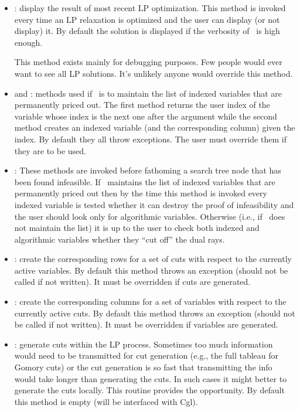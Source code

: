 \begin{itemize}
\item {}: display the result of most recent LP
  optimization. This method is invoked every time an LP relaxation is
  optimized and the user can display (or not display) it. By default the
  solution is displayed if the verbosity of \BB\ is high enough.

  This method exists mainly for debugging purposes. Few people would ever want
  to see all LP solutions. It's unlikely anyone would override this method.

\item {} and :
  methods used if \BB\ is to maintain the list of indexed variables that are
  permanently priced out. The first method returns the
  user index of the variable whose index is the next one after the argument
  while the second method creates an indexed variable (and the corresponding
  column) given the index.
  By default they all throw exceptions. The user must
  override them if they are to be used.

\item {}:
  These methods are invoked before fathoming a search tree node that has
  been found infeasible. If \BB\ maintains the list of indexed variables that
  are permanently priced out then by the time this method is invoked every
  indexed variable is tested whether it can destroy the proof of
  infeasibility and the user should look only for algorithmic variables.
  Otherwise (i.e., if \BB\ does not maintain the list) it is up to the user to
  check both indexed and algorithmic variables whether they ``cut off'' the
  dual rays. 

\item {}: create the corresponding rows for a set of cuts
  with 
  respect to the currently active variables. By default this method throws an
  exception (should not be called if not written). It must be overridden if
  cuts are generated.

\item {}: create the corresponding columns for a set of
  variables with respect to the currently active cuts. By default this
  method throws an exception (should not be called if not written). 
  It must be overridden if variables are generated.

\item {}: generate cuts within the LP process.
  Sometimes too much information 
  would need to be transmitted for cut generation (e.g., the full tableau
  for Gomory cuts) or the cut generation is so fast that transmitting the
  info would take longer than generating the cuts. In such cases it might
  better to generate the cuts locally. This routine provides the opportunity.
  By default this method is empty (will be interfaced with Cgl).


\end{itemize}
